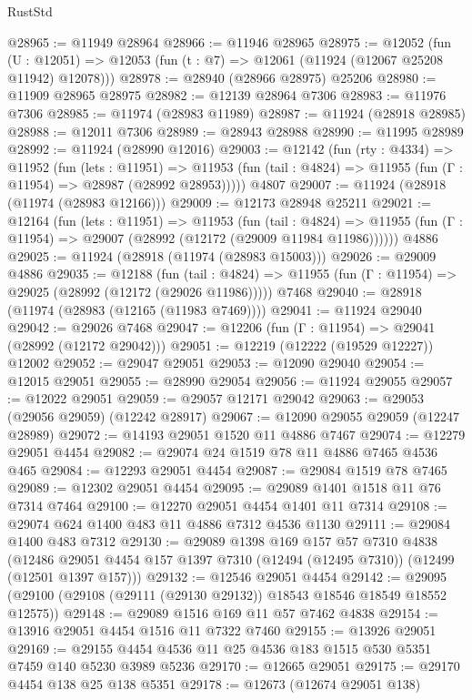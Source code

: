 \begin{lexlean}{RustStd}
\begin{coremodule}
@28965 := @11949 @28964
@28966 := @11946 @28965
@28975 := @12052
    (fun (U : @12051) => @12053 (fun (t : @7) => @12061 (@11924 (@12067 @25208 @11942) @12078)))
@28978 := @28940 (@28966 @28975) @25206
@28980 := @11909 @28965 @28975
@28982 := @12139 @28964 @7306
@28983 := @11976 @7306
@28985 := @11974 (@28983 @11989)
@28987 := @11924 (@28918 @28985)
@28988 := @12011 @7306
@28989 := @28943 @28988
@28990 := @11995 @28989
@28992 := @11924 (@28990 @12016)
@29003 := @12142
    (fun (rty : @4334) =>
    @11952
      (fun (lets : @11951) =>
      @11953 (fun (tail : @4824) => @11955 (fun (Γ : @11954) => @28987 (@28992 @28953)))))
    @4807
@29007 := @11924 (@28918 (@11974 (@28983 @12166)))
@29009 := @12173 @28948 @25211
@29021 := @12164
    (fun (lets : @11951) =>
    @11953
      (fun (tail : @4824) =>
      @11955 (fun (Γ : @11954) => @29007 (@28992 (@12172 (@29009 @11984 @11986))))))
    @4886
@29025 := @11924 (@28918 (@11974 (@28983 @15003)))
@29026 := @29009 @4886
@29035 := @12188
    (fun (tail : @4824) => @11955 (fun (Γ : @11954) => @29025 (@28992 (@12172 (@29026 @11986)))))
    @7468
@29040 := @28918 (@11974 (@28983 (@12165 (@11983 @7469))))
@29041 := @11924 @29040
@29042 := @29026 @7468
@29047 := @12206 (fun (Γ : @11954) => @29041 (@28992 (@12172 @29042)))
@29051 := @12219 (@12222 (@19529 @12227)) @12002
@29052 := @29047 @29051
@29053 := @12090 @29040
@29054 := @12015 @29051
@29055 := @28990 @29054
@29056 := @11924 @29055
@29057 := @12022 @29051
@29059 := @29057 @12171 @29042
@29063 := @29053 (@29056 @29059) (@12242 @28917)
@29067 := @12090 @29055 @29059 (@12247 @28989)
@29072 := @14193 @29051 @1520 @11 @4886 @7467
@29074 := @12279 @29051 @4454
@29082 := @29074 @24 @1519 @78 @11 @4886 @7465 @4536 @465
@29084 := @12293 @29051 @4454
@29087 := @29084 @1519 @78 @7465
@29089 := @12302 @29051 @4454
@29095 := @29089 @1401 @1518 @11 @76 @7314 @7464
@29100 := @12270 @29051 @4454 @1401 @11 @7314
@29108 := @29074 @624 @1400 @483 @11 @4886 @7312 @4536 @1130
@29111 := @29084 @1400 @483 @7312
@29130 := @29089
    @1398
    @169
    @157
    @57
    @7310
    @4838
    (@12486 @29051 @4454 @157 @1397 @7310 (@12494 (@12495 @7310)) (@12499 (@12501 @1397 @157)))
@29132 := @12546 @29051 @4454
@29142 := @29095 (@29100 (@29108 (@29111 (@29130 @29132)) @18543 @18546 @18549 @18552 @12575))
@29148 := @29089 @1516 @169 @11 @57 @7462 @4838
@29154 := @13916 @29051 @4454 @1516 @11 @7322 @7460
@29155 := @13926 @29051
@29169 := @29155 @4454 @4536 @11 @25 @4536 @183 @1515 @530 @5351 @7459 @140 @5230 @3989 @5236
@29170 := @12665 @29051
@29175 := @29170 @4454 @138 @25 @138 @5351
@29178 := @12673 (@12674 @29051 @138)

\end{coremodule}
\end{lexlean}
